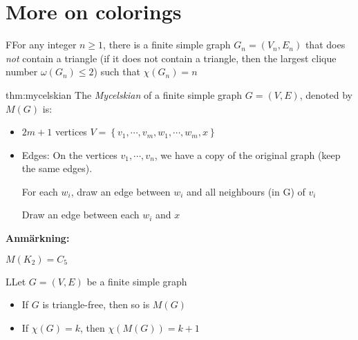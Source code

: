 \section{More on colorings}\par
\begin{theo}
  FFor any integer $n\geq1$, there is a finite simple graph $G_n = (V_n,E_n)$ that does \textit{not}  contain a triangle (if it does not contain a triangle, then the largest clique number $\omega(G_n)\leq2$) such that $\chi(G_n)=n$
\end{theo}
\par\bigskip
\begin{theo}[Mycelskian]{thm:mycelskian}
  The \textit{Mycelskian} of a finite simple graph $G = (V,E)$, denoted by $M(G)$ is:\par
  \begin{itemize}
  \item $2m+1$ vertices $V = \left\{v_1,\cdots,v_m,w_1,\cdots,w_m,x\right\}$\par
  \item Edges: On the vertices $v_1,\cdots,v_n$, we have a copy of the original graph (keep the same edges).
    \par\bigskip
    For each $w_i$, draw an edge between $w_i$ and all neighbours (in G) of $v_i$\par
    Draw an edge between each $w_i$ and $x$
  \end{itemize}
\end{theo}
\par\bigskip
\noindent\textbf{Anmärkning:}\par
\noindent $M(K_2) = C_5$
\par\bigskip
\begin{lem}
  LLet $G = (V,E)$ be a finite simple graph\par
  \begin{itemize}
    \item If $G$ is triangle-free, then so is $M(G)$\par
    \item If $\chi(G) = k$, then $\chi(M(G)) = k+1$
  \end{itemize}
\end{lem}
\newpage
